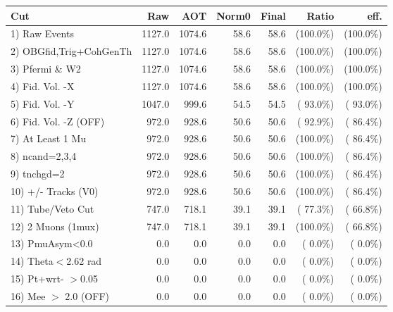  \begin{table}[h!]\centering
 \begin{tabular}{||l||r|r|r|r|r|r||}
 \hline
 \hline
 Cut & Raw & AOT & Norm0 & Final & Ratio & eff.       \\
 \hline
  1) Raw Events           &       1127.0 &       1074.6 &         58.6 &         58.6 & (100.0\%) & (100.0\%) \\
  2) OBGfid,Trig+CohGenTh &       1127.0 &       1074.6 &         58.6 &         58.6 & (100.0\%) & (100.0\%) \\
  3) Pfermi \& W2         &       1127.0 &       1074.6 &         58.6 &         58.6 & (100.0\%) & (100.0\%) \\
  4) Fid. Vol. -X         &       1127.0 &       1074.6 &         58.6 &         58.6 & (100.0\%) & (100.0\%) \\
  5) Fid. Vol. -Y         &       1047.0 &        999.6 &         54.5 &         54.5 & ( 93.0\%) & ( 93.0\%) \\
  6) Fid. Vol. -Z (OFF)   &        972.0 &        928.6 &         50.6 &         50.6 & ( 92.9\%) & ( 86.4\%) \\
  7) At Least 1 Mu        &        972.0 &        928.6 &         50.6 &         50.6 & (100.0\%) & ( 86.4\%) \\
  8) ncand=2,3,4          &        972.0 &        928.6 &         50.6 &         50.6 & (100.0\%) & ( 86.4\%) \\
  9) tnchgd=2             &        972.0 &        928.6 &         50.6 &         50.6 & (100.0\%) & ( 86.4\%) \\
 10) +/- Tracks (V0)      &        972.0 &        928.6 &         50.6 &         50.6 & (100.0\%) & ( 86.4\%) \\
 11) Tube/Veto Cut        &        747.0 &        718.1 &         39.1 &         39.1 & ( 77.3\%) & ( 66.8\%) \\
 12) 2 Muons (1mux)       &        747.0 &        718.1 &         39.1 &         39.1 & (100.0\%) & ( 66.8\%) \\
 13) PmuAsym<0.0          &          0.0 &          0.0 &          0.0 &          0.0 & (  0.0\%) & (  0.0\%) \\
 14) Theta$<$2.62 rad     &          0.0 &          0.0 &          0.0 &          0.0 & (  0.0\%) & (  0.0\%) \\
 15) Pt+wrt- $>$0.05      &          0.0 &          0.0 &          0.0 &          0.0 & (  0.0\%) & (  0.0\%) \\
 16) Mee $>$ 2.0  (OFF)   &          0.0 &          0.0 &          0.0 &          0.0 & (  0.0\%) & (  0.0\%) \\

\end{tabular}
\end{table}
